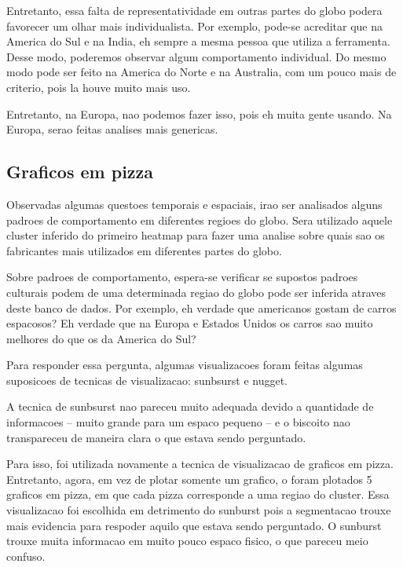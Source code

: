 \documentclass[10pt, conference]{IEEEtran}
\begin{document}
Entretanto, essa falta de representatividade em outras partes do globo podera favorecer um
olhar mais individualista. Por exemplo, pode-se acreditar que na America do Sul e na India,
eh sempre a mesma pessoa que utiliza a ferramenta. Desse modo, poderemos observar algum
comportamento individual. Do mesmo modo pode ser feito na America do Norte e na Australia,
com um pouco mais de criterio, pois la houve muito mais uso.

Entretanto, na Europa, nao podemos fazer isso, pois eh muita gente usando. Na Europa, serao
feitas analises mais genericas.




\subsection{Graficos em pizza}

Observadas algumas questoes temporais e espaciais, irao ser analisados alguns padroes de comportamento
em diferentes regioes do globo. Sera utilizado aquele cluster inferido do primeiro heatmap para
fazer uma analise sobre quais sao os fabricantes mais utilizados em diferentes partes do globo.

Sobre padroes de comportamento, espera-se verificar se supostos padroes culturais podem de uma determinada
regiao do globo pode ser inferida atraves deste banco de dados. Por exemplo, eh verdade que americanos
gostam de carros espacosos? Eh verdade que na Europa e Estados Unidos os carros sao muito melhores
do que os da America do Sul?

Para responder essa pergunta, algumas visualizacoes foram feitas algumas suposicoes de tecnicas
de visualizacao: sunbsurst e nugget. 

A tecnica de sunbsurst nao pareceu muito adequada devido a quantidade de informacoes -- muito grande para
um espaco pequeno -- e o biscoito nao transpareceu de maneira clara o que estava sendo perguntado.

Para isso, foi utilizada novamente a tecnica de visualizacao de graficos em pizza. Entretanto, agora,
em vez de plotar somente um grafico, o foram plotados 5 graficos em pizza, em que cada pizza corresponde
a uma regiao do cluster. Essa visualizacao foi escolhida em detrimento do sunburst pois a segmentacao
trouxe mais evidencia para respoder aquilo que estava sendo perguntado. O sunburst trouxe muita informacao
em muito pouco espaco fisico, o que pareceu meio confuso.
\end{document}
